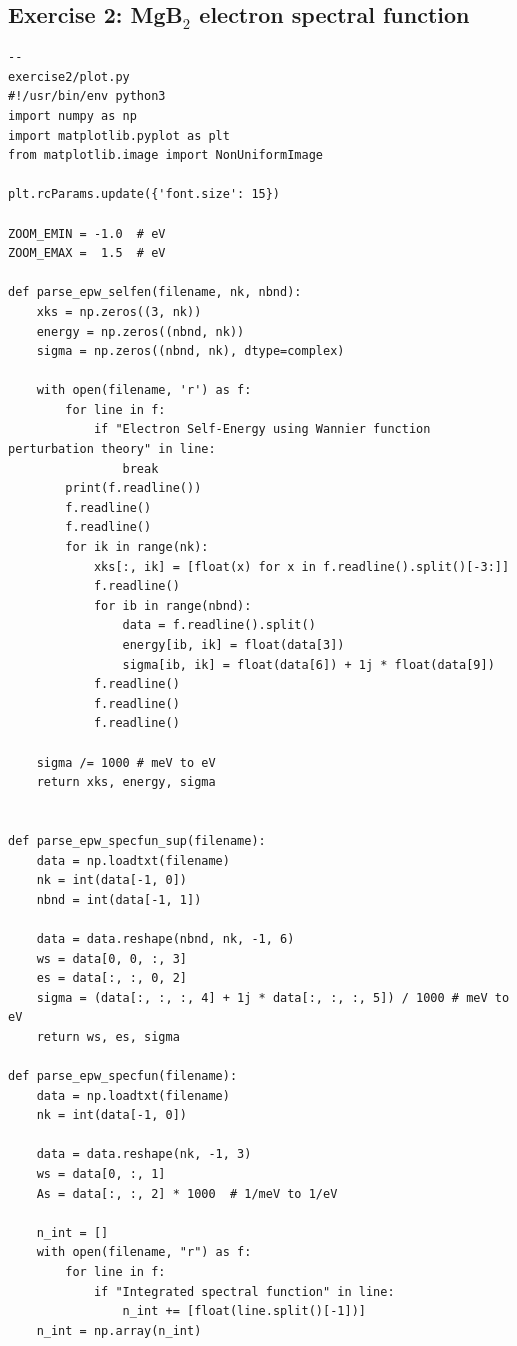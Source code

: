 \documentclass[a4paper,11pt,serif]{article}
\begin{document}
\subsection*{Exercise 2: MgB$_2$ electron spectral function}
\begin{scriptsize}
 \begin{Verbatim}[frame=single]
--                                                                       exercise2/plot.py
#!/usr/bin/env python3
import numpy as np
import matplotlib.pyplot as plt
from matplotlib.image import NonUniformImage

plt.rcParams.update({'font.size': 15})

ZOOM_EMIN = -1.0  # eV
ZOOM_EMAX =  1.5  # eV

def parse_epw_selfen(filename, nk, nbnd):
    xks = np.zeros((3, nk))
    energy = np.zeros((nbnd, nk))
    sigma = np.zeros((nbnd, nk), dtype=complex)

    with open(filename, 'r') as f:
        for line in f:
            if "Electron Self-Energy using Wannier function perturbation theory" in line:
                break
        print(f.readline())
        f.readline()
        f.readline()
        for ik in range(nk):
            xks[:, ik] = [float(x) for x in f.readline().split()[-3:]]
            f.readline()
            for ib in range(nbnd):
                data = f.readline().split()
                energy[ib, ik] = float(data[3])
                sigma[ib, ik] = float(data[6]) + 1j * float(data[9])
            f.readline()
            f.readline()
            f.readline()

    sigma /= 1000 # meV to eV
    return xks, energy, sigma


def parse_epw_specfun_sup(filename):
    data = np.loadtxt(filename)
    nk = int(data[-1, 0])
    nbnd = int(data[-1, 1])

    data = data.reshape(nbnd, nk, -1, 6)
    ws = data[0, 0, :, 3]
    es = data[:, :, 0, 2]
    sigma = (data[:, :, :, 4] + 1j * data[:, :, :, 5]) / 1000 # meV to eV
    return ws, es, sigma

def parse_epw_specfun(filename):
    data = np.loadtxt(filename)
    nk = int(data[-1, 0])

    data = data.reshape(nk, -1, 3)
    ws = data[0, :, 1]
    As = data[:, :, 2] * 1000  # 1/meV to 1/eV

    n_int = []
    with open(filename, "r") as f:
        for line in f:
            if "Integrated spectral function" in line:
                n_int += [float(line.split()[-1])]
    n_int = np.array(n_int)


\end{Verbatim}
\end{scriptsize}
\end{document}
